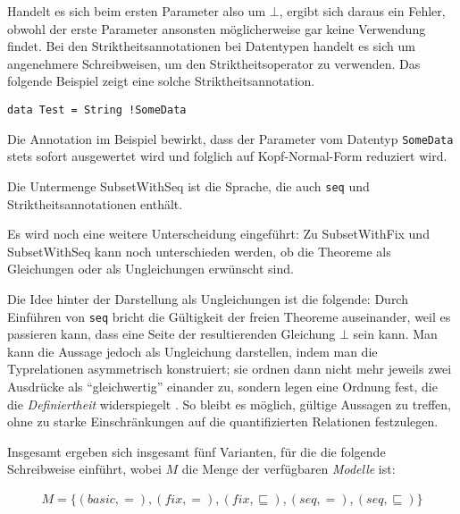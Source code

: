 Handelt es sich beim ersten Parameter also um $\bot$, ergibt sich daraus ein Fehler, obwohl der erste Parameter
ansonsten möglicherweise gar keine Verwendung findet. Bei den Striktheitsannotationen bei Datentypen handelt es sich
um angenehmere Schreibweisen, um den Striktheitsoperator zu verwenden. Das folgende Beispiel zeigt eine solche
Striktheitsannotation.

\begin{verbatim}
data Test = String !SomeData
\end{verbatim}

Die Annotation im Beispiel bewirkt, dass der Parameter vom Datentyp \texttt{SomeData} stets sofort ausgewertet wird und
folglich auf Kopf-Normal-Form reduziert wird.
 

Die Untermenge SubsetWithSeq ist die Sprache, die auch \texttt{seq} und Striktheitsannotationen enthält.

Es wird noch eine weitere Unterscheidung eingeführt: Zu SubsetWithFix und SubsetWithSeq kann noch unterschieden werden,
ob die Theoreme als Gleichungen oder als Ungleichungen erwünscht sind.

Die Idee hinter der Darstellung als Ungleichungen ist die folgende: Durch Einführen von \texttt{seq} bricht die Gültigkeit der
freien Theoreme auseinander, weil es passieren kann, dass eine Seite der resultierenden Gleichung $\bot$ sein kann.
Man kann die Aussage jedoch als Ungleichung darstellen, indem man die Typrelationen asymmetrisch konstruiert; sie
ordnen dann nicht mehr jeweils zwei Ausdrücke als ``gleichwertig'' einander zu, sondern legen eine Ordnung fest, die
die \textit{Definiertheit} widerspiegelt \cite{johann}. So bleibt es möglich, gültige Aussagen zu treffen, ohne zu starke
Einschränkungen auf die quantifizierten Relationen festzulegen.

Insgesamt ergeben sich insgesamt fünf Varianten, für die \cite{freetheorems} die folgende Schreibweise einführt,
wobei $M$ die Menge der verfügbaren \textit{Modelle} ist:

\begin{align}
M = \{(basic, =), (fix, =), (fix, \sqsubseteq), (seq, =), (seq, \sqsubseteq)\}
\end{align}

